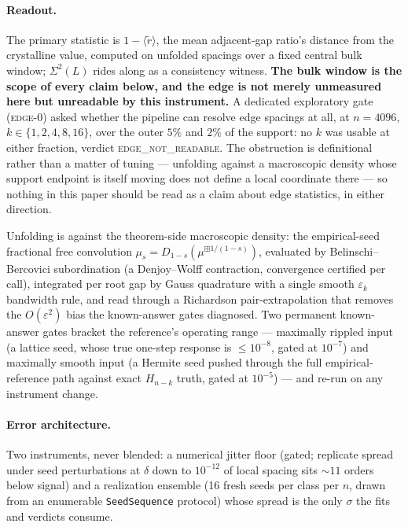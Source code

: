 \documentclass[11pt]{article}
\newcommand{\rt}{\widetilde{r}}
\newcommand{\gapdist}{1-\langle\rt\rangle}
\newcommand{\verdict}[1]{\textsc{#1}}
\begin{document}
\paragraph{Readout.} The primary statistic is $\gapdist$, the mean adjacent-gap ratio's distance
from the crystalline value, computed on unfolded spacings over a fixed central bulk window;
$\Sigma^2(L)$ rides along as a consistency witness. \textbf{The bulk window is the scope of
every claim below, and the edge is not merely unmeasured here but unreadable by this
instrument.} A dedicated exploratory gate (\textsc{edge-0}) asked whether the pipeline can
resolve edge spacings at all, at $n=4096$, $k\in\{1,2,4,8,16\}$, over the outer $5\%$ and $2\%$
of the support: no $k$ was usable at either fraction, verdict \verdict{edge\_not\_readable}. The
obstruction is definitional rather than a matter of tuning --- unfolding against a macroscopic
density whose support endpoint is itself moving does not define a local coordinate there --- so
nothing in this paper should be read as a claim about edge statistics, in either direction.

Unfolding is against the theorem-side macroscopic density: the empirical-seed fractional free
convolution $\mu_s=D_{1-s}\!\left(\mu^{\boxplus 1/(1-s)}\right)$, evaluated by
Belinschi--Bercovici subordination (a Denjoy--Wolff contraction, convergence certified per
call), integrated per root gap by Gauss quadrature with a single smooth $\varepsilon_k$
bandwidth rule, and read through a Richardson pair-extrapolation that removes the
$O(\varepsilon^2)$ bias the known-answer gates diagnosed. Two permanent known-answer gates
bracket the reference's operating range --- maximally rippled input (a lattice seed, whose true
one-step response is $\le 10^{-8}$, gated at $10^{-7}$) and maximally smooth input (a Hermite
seed pushed through the full empirical-reference path against exact $H_{n-k}$ truth, gated at
$10^{-5}$) --- and re-run on any instrument change.

\paragraph{Error architecture.} Two instruments, never blended: a numerical jitter floor
(gated; replicate spread under seed perturbations at $\delta$ down to $10^{-12}$ of local
spacing sits ${\sim}11$ orders below signal) and a realization ensemble (16 fresh seeds per
class per $n$, drawn from an enumerable \texttt{SeedSequence} protocol) whose spread is the only
$\sigma$ the fits and verdicts consume.
\end{document}
